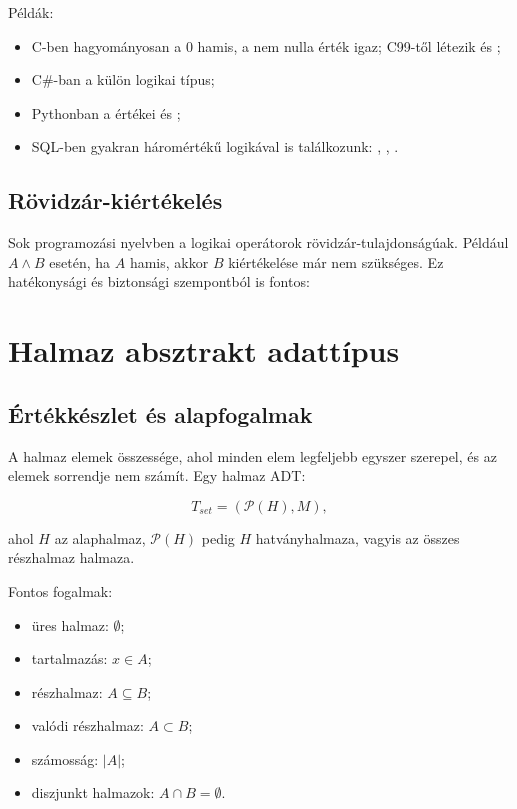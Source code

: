 Példák:

\begin{itemize}
  \item C-ben hagyományosan a $0$ hamis, a nem nulla érték igaz; C99-től létezik  és ;
  \item C\#-ban a  külön logikai típus;
  \item Pythonban a  értékei  és ;
  \item SQL-ben gyakran háromértékű logikával is találkozunk: , , .
\end{itemize}

\subsection{Rövidzár-kiértékelés}

Sok programozási nyelvben a logikai operátorok rövidzár-tulajdonságúak. Például $A\land B$ esetén, ha $A$ hamis, akkor $B$ kiértékelése már nem szükséges. Ez hatékonysági és biztonsági szempontból is fontos:


\section{Halmaz absztrakt adattípus}

\subsection{Értékkészlet és alapfogalmak}

A halmaz elemek összessége, ahol minden elem legfeljebb egyszer szerepel, és az elemek sorrendje nem számít. Egy halmaz ADT:

\[
T_{set}=(\mathcal{P}(H),M),
\]

ahol $H$ az alaphalmaz, $\mathcal{P}(H)$ pedig $H$ hatványhalmaza, vagyis az összes részhalmaz halmaza.

Fontos fogalmak:

\begin{itemize}
  \item üres halmaz: $\emptyset$;
  \item tartalmazás: $x\in A$;
  \item részhalmaz: $A\subseteq B$;
  \item valódi részhalmaz: $A\subset B$;
  \item számosság: $|A|$;
  \item diszjunkt halmazok: $A\cap B=\emptyset$.
\end{itemize}

